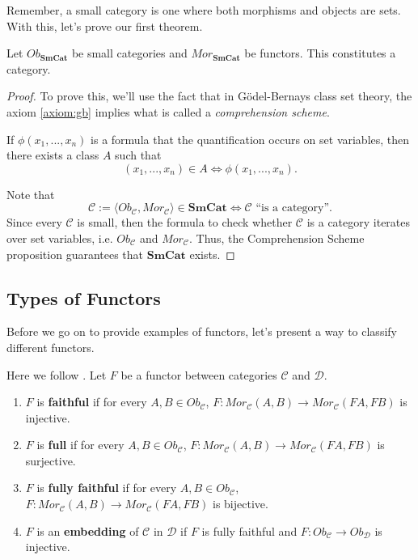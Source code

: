 Remember, a small category is one where both morphisms and objects are sets.
With this, let's prove our first theorem.
\begin{theorem}
	Let $Ob_{\textbf{SmCat}}$ be small categories and $Mor_{\textbf{SmCat}}$ be functors.
	This constitutes a category.
\end{theorem}
\begin{proof}
	To prove this, we'll use the fact that in Gödel-Bernays class set theory, the
	axiom \ref{axiom:gb} implies what is called a \textit{comprehension scheme}.
	\begin{proposition}
		If $\phi(x_1,...,x_n)$ is a formula that the quantification occurs on set variables, then
		there exists a class $A$ such that
		\begin{displaymath}
			(x_1,...,x_n) \in A \iff \phi(x_1,...,x_n).
		\end{displaymath}
	\end{proposition}
	Note that
	\begin{displaymath}
		\mathcal C := \langle Ob_\mathcal C, Mor_\mathcal C \rangle \in \textbf{SmCat} \iff
		\mathcal C \text{ ``is a category''}.
	\end{displaymath}
	Since every $\mathcal C$ is small, then the formula to check whether $\mathcal C$ is a category
	iterates over set variables, i.e. $Ob_\mathcal C$ and $Mor_\mathcal C$.
	Thus, the Comprehension Scheme proposition guarantees that $\textbf{SmCat}$ exists.
\end{proof}

\subsection{Types of Functors}

Before we go on to provide examples of functors, let's present
a way to classify different functors.

\begin{definition}
	Here we follow \citet{roman2017introduction}.
	Let $F$ be a functor between categories $\mathcal C$ and $\mathcal D$.
	\begin{enumerate}[1.]
		\item $F$ is \textbf{faithful} if for every $A,B \in Ob_\mathcal C$,
		      $F:Mor_\mathcal C(A,B)\to Mor_\mathcal C(FA,FB)$ is injective.
		\item $F$ is \textbf{full} if for every $A,B \in Ob_\mathcal C$,
		      $F:Mor_\mathcal C(A,B)\to Mor_\mathcal C(FA,FB)$ is surjective.
		\item $F$ is \textbf{fully faithful} if for every $A,B \in Ob_\mathcal C$,
		      $F:Mor_\mathcal C(A,B)\to Mor_\mathcal C(FA,FB)$ is bijective.
		\item $F$ is an \textbf{embedding} of $\mathcal C$ in $\mathcal D$ if $F$ is fully faithful
		      and $F:Ob_\mathcal C \to Ob_\mathcal D$ is injective.
	\end{enumerate}

\end{definition}

